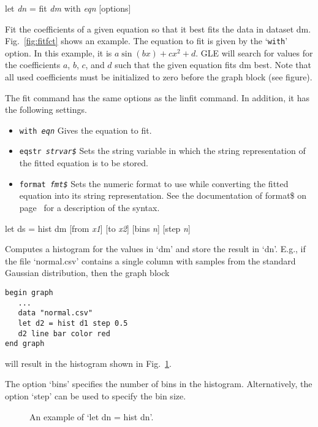 \begin{commanddescription}
\item[{\sf let {\it dn} = fit {\it dm} with {\it eqn} [options]}]

Fit the coefficients of a given equation so that it best fits the data in dataset dm. Fig.~\ref{fig:fitfct} shows an example. The equation to fit is given by the `\texttt{with}' option. In this example, it is $a\sin(bx)+cx^2+d$. GLE will search for values for the coefficients $a$, $b$, $c$, and $d$ such that the given equation fits dm best. Note that all used coefficients must be initialized to zero before the graph block (see figure).

The fit command has the same options as the linfit command. In addition, it has the following settings.

\begin{itemize}
\item \texttt{with {\it eqn}} Gives the equation to fit.

\item \texttt{eqstr {\it strvar\$}} Sets the string variable in which the string representation of the fitted equation is to be stored.

\item \texttt{format {\it fmt\$}} Sets the numeric format to use while converting the fitted equation into its string representation. See the documentation of {\sf format\$} on page~\pageref{formatnum:pg} for a description of the syntax.
\end{itemize}

\item[{\sf let ds = hist dm [from {\it x1}] [to {\it x2}] [bins {\it n}] [step {\it n}]}]

Computes a histogram for the values in `dm' and store the result in `dn'. E.g., if the file `normal.csv' contains a single column with samples from the standard Gaussian distribution, then the graph block

\begin{Verbatim}
begin graph
   ...
   data "normal.csv"
   let d2 = hist d1 step 0.5
   d2 line bar color red 
end graph
\end{Verbatim}

\noindent{}will result in the histogram shown in Fig.~\ref{hist:fig}.

The option `{\sf bins}' specifies the number of bins in the histogram. Alternatively, the option `{\sf step}' can be used to specify the bin size.

\begin{figure}[tb]
\centering
\mbox{}
\caption{\label{hist:fig}An example of `let dn = hist dn'.}
\end{figure}


\end{commanddescription}
